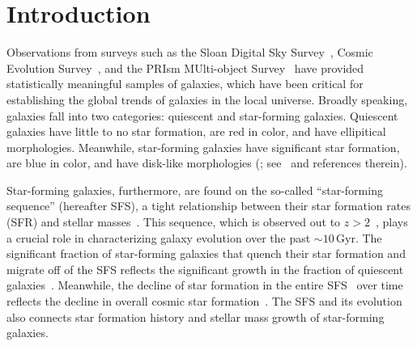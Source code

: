 \documentclass[12pt, letterpaper, preprint, tighten]{aastex62}
\begin{document}

\section{Introduction}
Observations from surveys such as the Sloan Digital Sky 
Survey~\citep[SDSS;][]{york2000}, Cosmic Evolution
Survey~\citep[COSMOS;][]{scoville2007},
and the PRIsm MUlti-object Survey~\citep[PRIMUS;][]{coil2011, cool2013} 
have provided statistically meaningful samples of galaxies, 
which have been critical for establishing the global trends of 
galaxies in the local universe. Broadly speaking, galaxies 
fall into two categories: quiescent and star-forming galaxies. 
Quiescent galaxies have little to no star formation, are red 
in color, and have ellipitical morphologies. Meanwhile, 
star-forming galaxies have significant star formation, are blue 
in color, and have disk-like morphologies (\citealt{kauffmann2003, blanton2003, baldry2006, taylor2009, moustakas2013}; 
see~\citealt{blanton2009} and references therein). 

Star-forming galaxies, furthermore, are found on the so-called 
``star-forming sequence'' (hereafter SFS), a tight relationship 
between their star formation rates (SFR) and stellar 
masses~\citep[][see also Figure~\ref{fig:groupcat}]{noeske2007, daddi2007, salim2007, speagle2014, lee2015}.
This sequence, which is observed out to $z > 2$~\citep{wang2013, 
leja2015, schreiber2015}, plays a crucial role in characterizing 
galaxy evolution over the past ${\sim}10\,\mathrm{Gyr}$. 
The significant fraction of star-forming galaxies that quench their 
star formation and migrate off of the SFS reflects the significant 
growth in the fraction of quiescent galaxies~\citep{blanton2006, borch2006, bundy2006, moustakas2013}. 
Meanwhile, the decline of star formation in the entire SFS~\citep{lee2015, schreiber2015} 
over time reflects the decline in overall cosmic star formation~\citep{hopkins2006, behroozi2013a, madau2014}.
The SFS and its evolution also connects star formation history
and stellar mass growth of star-forming galaxies. 
\end{document}
